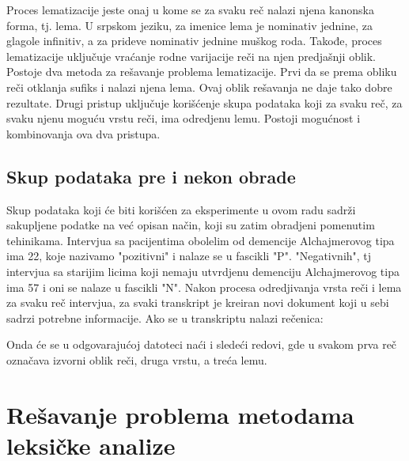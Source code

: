 \documentclass[12pt,oneside]{memoir}
\begin{document}
Proces lematizacije jeste onaj u kome se za svaku reč nalazi njena kanonska forma, tj. lema. U srpskom jeziku,  za imenice lema je nominativ jednine,  za glagole infinitiv,  a za prideve nominativ jednine muškog roda. Takođe,  proces lematizacije uključuje vraćanje rodne varijacije reči na njen predjašnji oblik. 
Postoje dva metoda za rešavanje problema lematizacije.  Prvi da se prema obliku reči otklanja sufiks i nalazi njena lema.  Ovaj oblik rešavanja ne daje tako dobre rezultate.  Drugi pristup uključuje korišćenje skupa podataka koji za svaku reč,  za svaku njenu moguću vrstu reči,  ima odredjenu lemu.  Postoji mogućnost i kombinovanja ova dva pristupa. 

\section{Skup podataka pre i nekon obrade}

Skup podataka koji će biti korišćen za eksperimente u ovom radu sadrži sakupljene podatke na već opisan način,  koji su zatim obradjeni pomenutim tehinikama.  Intervjua sa pacijentima obolelim od demencije Alchajmerovog tipa ima 22,  koje nazivamo "pozitivni" i nalaze se u fascikli "P".  "Negativnih",  tj intervjua sa starijim licima koji nemaju utvrdjenu demenciju Alchajmerovog tipa ima 57 i oni se nalaze u fascikli "N".  Nakon procesa odredjivanja vrsta reči i lema za svaku reč intervjua,  za svaki transkript je kreiran novi dokument koji u sebi sadrzi potrebne informacije.  Ako se u transkriptu nalazi rečenica:
\newline

\noindent{}
\newline\newline
Onda će se u odgovarajućoj datoteci naći i sledeći redovi, gde u svakom prva reč označava izvorni oblik reči, druga vrstu, a treća lemu. 
\newline

\noindent{}

\chapter{Rešavanje problema metodama leksičke analize}
\end{document}
